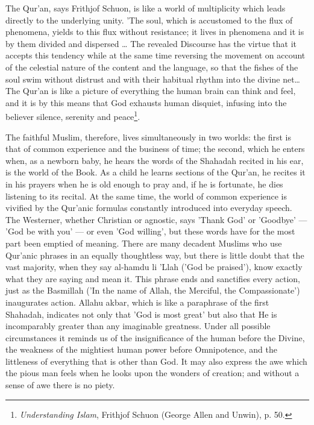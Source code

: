 \documentclass[11pt, b5paper, twoside]{book}
\begin{document}
The Qur'an, says Frithjof Schuon, is like a world of multiplicity which leads directly to the 
underlying unity. 'The soul, which is accustomed to the flux of phenomena, yields to this flux 
without resistance; it lives in phenomena and it is by them divided and dispersed \ldots{} The revealed 
Discourse has the virtue that it accepts this tendency while at the same time reversing the movement 
on account of the celestial nature of the content and the language, so that the fishes of the soul 
swim without distrust and with their habitual rhythm into the divine net\ldots{} The Qur'an is like a 
picture of everything the human brain can think and feel, and it is by this means that God exhausts 
human disquiet, infusing into the believer silence, serenity and peace\footnote{\emph{Understanding Islam}, Frithjof Schuon (George Allen and Unwin), p. 50.}.

The faithful Muslim, therefore, lives simultaneously in two worlds: the first is that of common 
experience and the business of time; the second, which he enters when, as a newborn baby, he hears 
the words of the Shahadah recited in his ear, is the world of the Book. As a child he learns sections 
of the Qur'an, he recites it in his prayers when he is old enough to pray and, if he is fortunate, he 
dies listening to its recital. At the same time, the world of common experience is vivified by the 
Qur'anic formulas constantly introduced into everyday speech. \\

The Westerner, whether Christian or agnostic, says 'Thank God' or 'Goodbye' --- 'God be with you' --- or 
even 'God willing', but these words have for the most part been emptied of meaning. There are many 
decadent Muslims who use Qur'anic phrases in an equally thoughtless way, but there is little doubt 
that the vast majority, when they say al-hamdu li 'Llah ('God be praised'), know exactly what they 
are saying and mean it. This phrase ends and sanctifies every action, just as the Basmillah ('In the 
name of Allah, the Merciful, the Compassionate') inaugurates action. Allahu akbar, which is like a 
paraphrase of the first Shahadah, indicates not only that 'God is most great' but also that He is 
incomparably greater than any imaginable greatness. Under all possible circumstances it reminds us of 
the insignificance of the human before the Divine, the weakness of the mightiest human power before 
Omnipotence, and the littleness of everything that is other than God. It may also express the awe 
which the pious man feels when he looks upon the wonders of creation; and without a sense of awe 
there is no piety. \\
\end{document}
